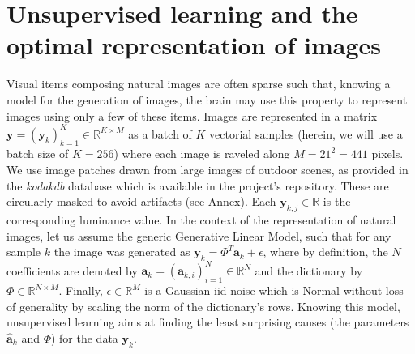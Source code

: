 \documentclass[vision,article,submit,oneauthor,pdftex]{Definitions/mdpi}
\newcommand{\coef}{\mathbf{a}} %
\newcommand{\image}{\mathbf{y}} %
\newcommand{\dico}{\Phi} %
\newcommand{\eqdef}{\ensuremath{\stackrel{\mbox{\upshape\tiny def.}}{=}}}
\newcommand{\RR}{\mathbb{R}}
\begin{document}
\section{Unsupervised learning and the optimal representation of images}%
%
%
%
Visual items composing natural images are often sparse such that, knowing a model for the generation of images, the brain may use this property to represent images using only a few of these items.
Images are represented in a matrix $\image = (\image_k)_{k=1}^K \in \RR^{K \times M}$ as a batch of $K$ vectorial samples (herein, we will use a batch size of $K=256$) where each image is raveled along $M = 21^2 = 441$ pixels. We use image patches drawn from large images of outdoor scenes, as provided in the \emph{kodakdb} database which is available in the project's repository. These are circularly masked to avoid artifacts (see \href{https://spikeai.github.io/HULK/#Loading-a-database}{Annex}). Each $\image_{k, j} \in \RR$ is the corresponding luminance value. In the context of the representation of natural images, let us assume the generic Generative Linear Model, such that for any sample $k$ the image was generated as $\image_k = \dico^T \coef_{k} + \epsilon $, where by definition, the $N$ coefficients are denoted by $\coef_{k} = (\coef_{k, i})_{i=1}^N \in \RR^{N}$ and the dictionary by $\dico \in \RR^{N \times M}$. Finally, $\epsilon \in \RR^{M}$ is a Gaussian iid noise which is Normal without loss of generality by scaling the norm of the dictionary's rows. Knowing this model, unsupervised learning aims at finding the least surprising causes (the parameters $\hat{\coef}_{k}$ and $\dico$) for the data $\image_k$.
\end{document}
